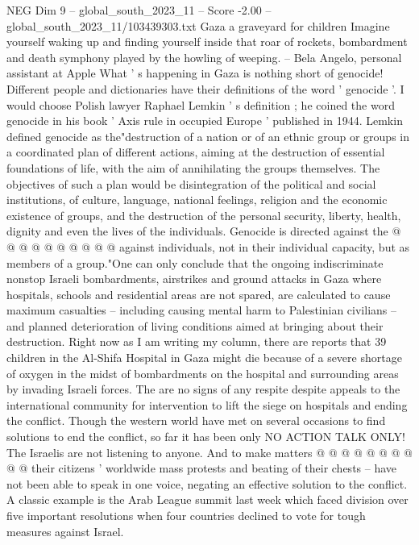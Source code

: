 \begin{textsample}{NEG Dim 9 – global\_south\_2023\_11 – Score -2.00 – global\_south\_2023\_11/103439303.txt}  \label{ex:f9_neg_429}
Gaza a graveyard for children Imagine yourself waking up and finding yourself inside that roar of rockets, bombardment and death symphony played by the howling of weeping. -- Bela Angelo, personal assistant at Apple What ' s happening in Gaza is nothing short of genocide!
Different people and dictionaries have their definitions of the word ' genocide '.
I would choose Polish lawyer Raphael Lemkin ' s definition ; he coined the word genocide in his book ' Axis rule in occupied Europe ' published in 1944.
Lemkin defined genocide as the"destruction of a nation or of an ethnic group or groups in a coordinated plan of different actions, aiming at the destruction of essential foundations of life, with the aim of annihilating the groups themselves.
The objectives of such a plan would be disintegration of the political and social institutions, of culture, language, national feelings, religion and the economic existence of groups, and the destruction of the personal security, liberty, health, dignity and even the lives of the individuals.
Genocide is directed against the @ @ @ @ @ @ @ @ @ @ against individuals, not in their individual capacity, but as members of a group."One can only conclude that the ongoing indiscriminate nonstop Israeli bombardments, airstrikes and ground attacks in Gaza where hospitals, schools and residential areas are not spared, are calculated to cause maximum casualties -- including causing mental harm to Palestinian civilians -- and planned deterioration of living conditions aimed at bringing about their destruction.
Right now as I am writing my column, there are reports that 39 children in the Al-Shifa Hospital in Gaza might die because of a severe shortage of oxygen in the midst of bombardments on the hospital and surrounding areas by invading Israeli forces.
The are no signs of any respite despite appeals to the international community for intervention to lift the siege on hospitals and ending the conflict.
Though the western world have met on several occasions to find solutions to end the conflict, so far it has been only NO ACTION TALK ONLY!
The Israelis are not listening to anyone.
And to make matters @ @ @ @ @ @ @ @ @ @ their citizens ' worldwide mass protests and beating of their chests -- have not been able to speak in one voice, negating an effective solution to the conflict.
A classic example is the Arab League summit last week which faced division over five important resolutions when four countries declined to vote for tough measures against Israel.

\end{textsample}
